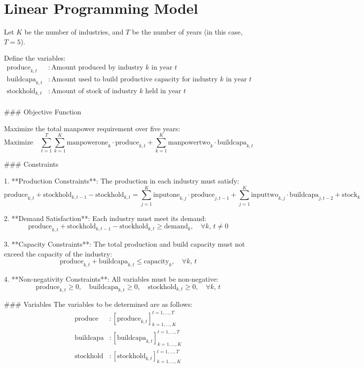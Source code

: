 \documentclass{article}
\begin{document}
\section*{Linear Programming Model}

Let $K$ be the number of industries, and $T$ be the number of years (in this case, $T = 5$). 

Define the variables:
\begin{align*}
\text{produce}_{k, t} & : \text{Amount produced by industry } k \text{ in year } t \\
\text{buildcapa}_{k, t} & : \text{Amount used to build productive capacity for industry } k \text{ in year } t \\
\text{stockhold}_{k, t} & : \text{Amount of stock of industry } k \text{ held in year } t \\
\end{align*}

### Objective Function

Maximize the total manpower requirement over five years:
\[
\text{Maximize} \quad \sum_{t=1}^{T} \sum_{k=1}^{K} \text{manpowerone}_{k} \cdot \text{produce}_{k, t} + \sum_{k=1}^{K} \text{manpowertwo}_{k} \cdot \text{buildcapa}_{k, t}
\]

### Constraints

1. **Production Constraints**:
   The production in each industry must satisfy:
   \[
   \text{produce}_{k, t} + \text{stockhold}_{k, t-1} - \text{stockhold}_{k, t} = \sum_{j=1}^{K} \text{inputone}_{k, j} \cdot \text{produce}_{j, t-1} + \sum_{j=1}^{K} \text{inputtwo}_{k, j} \cdot \text{buildcapa}_{j, t-2} + \text{stock}_{k}
   \]

2. **Demand Satisfaction**:
   Each industry must meet its demand:
   \[
   \text{produce}_{k, t} + \text{stockhold}_{k, t-1} - \text{stockhold}_{k, t} \geq \text{demand}_{k}, \quad \forall k, \, t \neq 0
   \]

3. **Capacity Constraints**:
   The total production and build capacity must not exceed the capacity of the industry:
   \[
   \text{produce}_{k, t} + \text{buildcapa}_{k, t} \leq \text{capacity}_{k}, \quad \forall k, \, t
   \]

4. **Non-negativity Constraints**:
   All variables must be non-negative:
   \[
   \text{produce}_{k, t} \geq 0, \quad \text{buildcapa}_{k, t} \geq 0, \quad \text{stockhold}_{k, t} \geq 0, \quad \forall k, \, t
   \]

### Variables
The variables to be determined are as follows:
\[
\begin{align*}
\text{produce} & : \left[\text{produce}_{k, t} \right]_{k=1, \ldots, K}^{t=1, \ldots, T} \\
\text{buildcapa} & : \left[\text{buildcapa}_{k, t} \right]_{k=1, \ldots, K}^{t=1, \ldots, T} \\
\text{stockhold} & : \left[\text{stockhold}_{k, t} \right]_{k=1, \ldots, K}^{t=1, \ldots, T}
\end{align*}
\]
\end{document}
